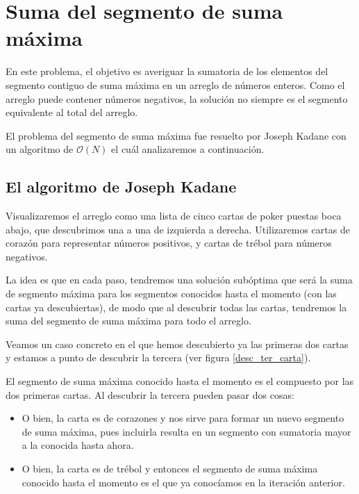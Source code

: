 \documentclass[12pt, a4paper, openany, fleqn]{book}
\newif\ifUsePstPoker
\begin{document}
    \section{Suma del segmento de suma máxima}

    En este problema, el objetivo es averiguar la sumatoria de los elementos del segmento contiguo de suma máxima en un arreglo de números enteros.
    Como el arreglo puede contener números negativos, la solución no siempre es el segmento equivalente al total del arreglo.

    El problema del segmento de suma máxima fue resuelto por Joseph Kadane con un algoritmo de $\mathcal{O}(N)$ el cuál analizaremos a continuación.

    \subsection*{El algoritmo de Joseph Kadane}
    Visualizaremos el arreglo como una lista de cinco cartas de poker puestas boca abajo, que descubrimos una a una de izquierda a derecha. Utilizaremos cartas de corazón para representar números positivos, y cartas de trébol para números negativos.

    La idea es que en cada paso, tendremos una solución subóptima que será la suma de segmento máxima para los segmentos conocidos hasta el momento (con las cartas ya descubiertas), de modo que al descubrir todas las cartas, tendremos la suma del segmento de suma máxima para todo el arreglo.

    Veamos un caso concreto en el que hemos descubierto ya las primeras dos cartas y estamos a punto de descubrir la tercera (ver figura \ref{desc_ter_carta}).

    \ifUsePstPoker
        \begin{figure}[h]
            \centering
            \psset{framebg=beige}\crdsevh
            \psset{framebg=beige}\crdtwoh
            \psset{backcolor=red}\crdback
            \psset{backcolor=red}\crdback
            \psset{backcolor=red}\crdback
            \rput(-8.2,-1){\textbf{\^}} %

            \caption{Descubriendo la tercera carta} \label{desc_ter_carta}
        \end{figure}
    \fi

    El segmento de suma máxima conocido hasta el momento es el compuesto por las dos primeras cartas. Al descubrir la tercera pueden pasar dos cosas:
    \begin{itemize}
        \item O bien, la carta es de corazones y nos sirve para formar un nuevo segmento de suma máxima, pues incluirla resulta en un segmento con sumatoria mayor a la conocida hasta ahora.
        \item O bien, la carta es de trébol y entonces el segmento de suma máxima conocido hasta el momento es el que ya conocíamos en la iteración anterior.
    \end{itemize}
\end{document}
